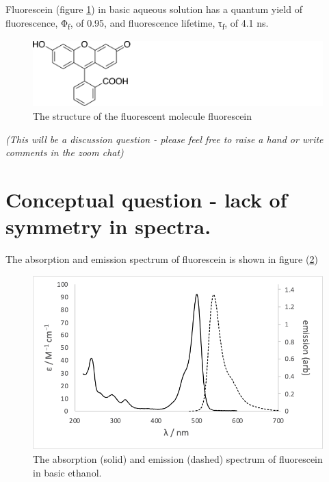 \documentclass[
]{book}
\begin{document}
Fluorescein (figure \ref{fig:fluorescein}) in basic aqueous solution has a quantum yield of fluorescence, Φ\textsubscript{f}, of 0.95, and fluorescence lifetime, τ\textsubscript{f}, of 4.1 ns.

\begin{figure}

{\centering \includegraphics[width=0.7\linewidth]{images/fluorescein} 

}

\caption{The structure of the fluorescent molecule fluorescein}\label{fig:fluorescein}
\end{figure}

\emph{(This will be a discussion question - please feel free to raise a hand or write comments in the zoom chat)}

\hypertarget{conceptual-question---lack-of-symmetry-in-spectra.}{%
\section{Conceptual question - lack of symmetry in spectra.}\label{conceptual-question---lack-of-symmetry-in-spectra.}}

The absorption and emission spectrum of fluorescein is shown in figure (\ref{fig:fluoresceinspec})

\begin{figure}

{\centering \includegraphics[width=0.7\linewidth]{images/fluoresceinspec} 

}

\caption{The absorption (solid) and emission (dashed) spectrum of fluorescein in basic ethanol.}\label{fig:fluoresceinspec}
\end{figure}
\end{document}
